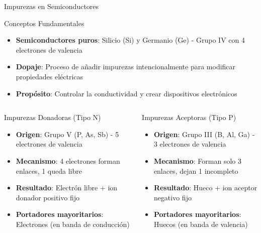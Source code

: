 \documentclass[
    10pt,
    aspectratio=169,
    xcolor={dvipsnames},
    spanish,
    ]{beamer}
\begin{document}
\begin{frame}{Impurezas en Semiconductores}
\begin{block}{Conceptos Fundamentales}
  \begin{itemize}
    \item 	\textbf{Semiconductores puros}: Silicio (Si) y Germanio (Ge) - Grupo IV con 4 electrones de valencia
    \item 	\textbf{Dopaje}: Proceso de añadir impurezas intencionalmente para modificar propiedades eléctricas
    \item 	\textbf{Propósito}: Controlar la conductividad y crear dispositivos electrónicos
  \end{itemize}
\end{block}

\begin{columns}
  \begin{column}{0.48\textwidth}
    \begin{block}{Impurezas Donadoras (Tipo N)}
      \scriptsize
      \begin{itemize}
        \item 	\textbf{Origen}: Grupo V (P, As, Sb) - 5 electrones de valencia
        \item 	\textbf{Mecanismo}: 4 electrones forman enlaces, 1 queda libre
        \item 	\textbf{Resultado}: Electrón libre + ion donador positivo fijo
        \item 	\textbf{Portadores mayoritarios}: Electrones (en banda de conducción)
      \end{itemize}
    \end{block}
  \end{column}

  \begin{column}{0.48\textwidth}
    \begin{block}{Impurezas Aceptoras (Tipo P)}
      \scriptsize
      \begin{itemize}
        \item 	\textbf{Origen}: Grupo III (B, Al, Ga) - 3 electrones de valencia
        \item 	\textbf{Mecanismo}: Forman solo 3 enlaces, dejan 1 incompleto
        \item 	\textbf{Resultado}: Hueco + ion aceptor negativo fijo
        \item 	\textbf{Portadores mayoritarios}: Huecos (en banda de valencia)
      \end{itemize}
    \end{block}
  \end{column}
\end{columns}
\end{frame}
\end{document}
